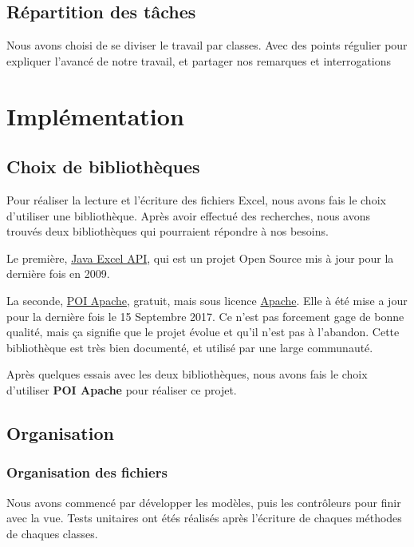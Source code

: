 \documentclass{polytech/polytech}
\begin{document}
	\section{Répartition des tâches}

	Nous avons choisi de se diviser le travail par classes.
	Avec des points régulier pour expliquer l'avancé de notre travail, et partager nos remarques et
	interrogations

	\chapter{Implémentation}

	\section{Choix de bibliothèques}


	Pour réaliser la lecture et l'écriture des fichiers Excel, nous avons fais le choix d'utiliser une bibliothèque.
	Après avoir effectué des recherches, nous avons trouvés deux bibliothèques qui pourraient répondre à nos besoins.

	Le première, \href{http://jexcelapi.sourceforge.net/}{Java Excel API}, qui est un projet Open Source mis à jour pour la dernière fois en 2009.

	La seconde, \href{http://poi.apache.org}{POI Apache}, gratuit, mais sous licence \href{https://www.apache.org/licenses/}{Apache}.
	Elle à été mise a jour pour la dernière fois le 15 Septembre 2017.
	Ce n'est pas forcement gage de bonne qualité, mais ça signifie que le projet évolue et qu'il n'est pas à l'abandon.
	Cette bibliothèque est très bien documenté, et utilisé par une large communauté.

	Après quelques essais avec les deux bibliothèques, nous avons fais le choix d'utiliser \textbf{POI Apache} pour réaliser ce projet.

	\section{Organisation}

	\subsection{Organisation des fichiers}

	Nous avons commencé par développer les modèles, puis les contrôleurs pour finir avec la vue.
	Tests unitaires ont étés réalisés après l'écriture de chaques méthodes de chaques classes.
\end{document}
